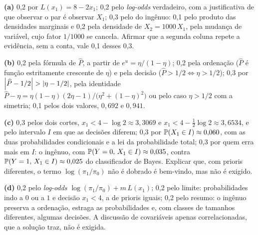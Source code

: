 \documentclass[11pt,a4paper]{article}
\begin{document}
\begin{criterio}
\textbf{(a)} 0,2 por $L(x_1)=8-2x_1$; 0,2 pelo \emph{log-odds} verdadeiro, com a
justificativa de que observar o par é observar $X_1$; 0,3 pelo do ingênuo: 0,1 pelo
produto das densidades marginais e 0,2 pela densidade de $X_2=1000\,X_1$, pela mudança de
variável, cujo fator $1/1000$ se cancela. Afirmar que a segunda coluna repete a
evidência, sem a conta, vale 0,1 desses 0,3.

\textbf{(b)} 0,2 pela fórmula de $\widehat P$, a partir de $e^u=\eta/(1-\eta)$; 0,2 pela
ordenação ($\widehat P$ é função estritamente crescente de $\eta$) e pela decisão
($\widehat P>1/2\iff\eta>1/2$); 0,3 por $\left\lvert \widehat P-1/2 \right\rvert>\left\lvert \eta-1/2 \right\rvert$, pela
identidade $\widehat P-\eta=\eta(1-\eta)(2\eta-1)/\big(\eta^2+(1-\eta)^2\big)$ ou pelo
caso $\eta>1/2$ com a simetria; 0,1 pelos dois valores, $0{,}692$ e $0{,}941$.

\textbf{(c)} 0,3 pelos dois cortes, $x_1<4-\log2\approx3{,}3069$ e
$x_1<4-\tfrac12\log2\approx3{,}6534$, e pelo intervalo $I$ em que as decisões diferem;
0,3 por $\mathbb{P}(X_1\in I)\approx0{,}060$, com as duas probabilidades condicionais e a lei
da probabilidade total; 0,3 por quem erra mais em $I$: o ingênuo, com
$\mathbb{P}(Y=0,\,X_1\in I)\approx0{,}035$, contra $\mathbb{P}(Y=1,\,X_1\in I)\approx0{,}025$ do
classificador de Bayes. Explicar que, com prioris diferentes, o termo $\log(\pi_1/\pi_0)$
não é dobrado é bem-vindo, mas não é exigido.

\textbf{(d)} 0,2 pelo \emph{log-odds} $\log(\pi_1/\pi_0)+m\,L(x_1)$; 0,2 pelo limite:
probabilidades indo a $0$ ou a $1$ e decisão $x_1<4$, a de prioris iguais; 0,2 pelo
resumo: o ingênuo preserva a ordenação, estraga as probabilidades e, com classes de
tamanhos diferentes, algumas decisões. A discussão de covariáveis apenas correlacionadas,
que a solução traz, não é exigida.
\end{criterio}


\end{document}
